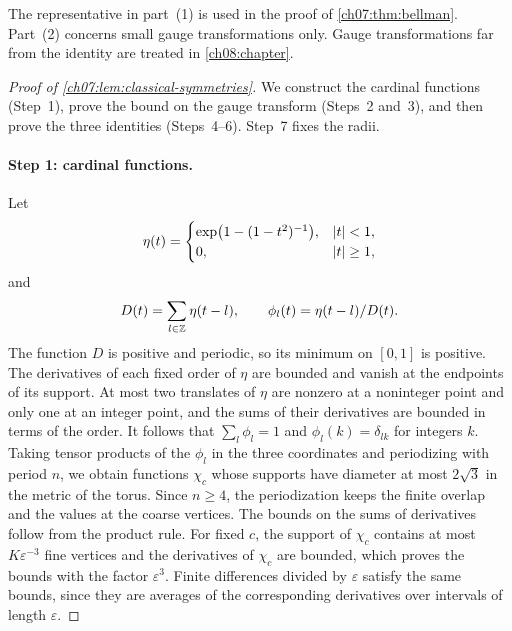 The representative in part~(1) is used in the proof of \cref{ch07:thm:bellman}. Part~(2) concerns small gauge transformations only. Gauge transformations far from the identity are treated in \cref{ch08:chapter}.

\begin{proof}[Proof of \cref{ch07:lem:classical-symmetries}]
We construct the cardinal functions (Step~1), prove the bound on the gauge transform (Steps~2 and~3), and then prove the three identities (Steps~4--6). Step~7 fixes the radii.

\paragraph{Step 1: cardinal functions.}
Let
\[
 \eta(t)=\begin{cases}\exp\bigl(1-(1-t^2)^{-1}\bigr),&\lvert t\rvert<1,\\0,&\lvert t\rvert\ge1,\end{cases}
\]
and
\[
 D(t)=\sum_{l\in\mathbb Z}\eta(t-l),\qquad\phi_l(t)=\eta(t-l)/D(t).
\]
The function $D$ is positive and periodic, so its minimum on $[0,1]$ is positive. The derivatives of each fixed order of $\eta$ are bounded and vanish at the endpoints of its support. At most two translates of $\eta$ are nonzero at a noninteger point and only one at an integer point, and the sums of their derivatives are bounded in terms of the order. It follows that $\sum_l\phi_l=1$ and $\phi_l(k)=\delta_{lk}$ for integers $k$. Taking tensor products of the $\phi_l$ in the three coordinates and periodizing with period $n$, we obtain functions $\chi_c$ whose supports have diameter at most $2\sqrt3$ in the metric of the torus. Since $n\ge4$, the periodization keeps the finite overlap and the values at the coarse vertices. The bounds on the sums of derivatives follow from the product rule. For fixed $c$, the support of $\chi_c$ contains at most $K\varepsilon^{-3}$ fine vertices and the derivatives of $\chi_c$ are bounded, which proves the bounds with the factor $\varepsilon^3$. Finite differences divided by $\varepsilon$ satisfy the same bounds, since they are averages of the corresponding derivatives over intervals of length $\varepsilon$.


\end{proof}
